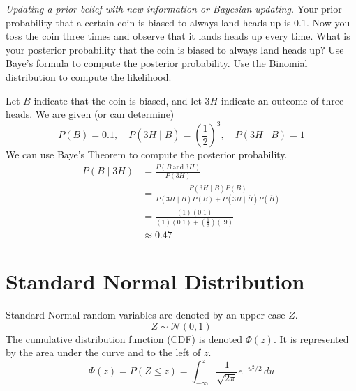 \emph{Updating a prior belief with new information or Bayesian updating.}
Your prior probability that a certain coin is biased to always land
heads up is 0.1. Now you toss the coin three times and observe that it
lands heads up every time. What is your posterior probability that the
coin is biased to always land heads up?  Use Baye's formula to compute
the posterior probability. Use the Binomial distribution to compute
the likelihood.

Let $B$ indicate that the coin is biased, and let $3H$ indicate an
outcome of three heads. We are given (or can determine)
\[
P(B) = 0.1, \quad P(3H \mid \overline{B}) = \left(\frac{1}{2}\right)^3, \quad P(3H \mid B) = 1
\]
We can use Baye's Theorem to compute the posterior probability.
\begin{align*}
P(B \mid 3H) &= \frac{P(B~\text{and}~3H)}{P(3H)} \\
&= \frac{P(3H \mid B)P(B)}{P(3H \mid B)P(B) + P(3H \mid \overline{B})P(\overline{B})} \\
&= \frac{(1)(0.1)}{(1)(0.1) + \left(\frac{1}{8}\right)(.9)} \\
&\approx 0.47
\end{align*}

\chapter{Standard Normal Distribution}

Standard Normal random
  variables are denoted by an upper case $Z$. 
  \[ Z \sim \mathcal{N}(0,1) \]
The cumulative distribution function (CDF) is denoted
  $\Phi(z)$. It is represented by the area under the curve and to the
  left of $z$.
  \[
  \Phi(z) = P(Z \leq z) = \int_{-\infty}^z \frac{1}{\sqrt{2\pi}}e^{-u^2/2}\, du
  \]


\begin{center}
\end{center}

